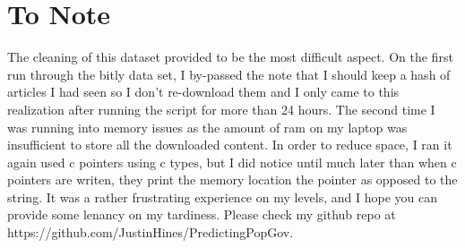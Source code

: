\documentclass[11pt]{article}
\begin{document}
\section{To Note}
The cleaning of this dataset provided to be the most difficult aspect.  On the first run through the bitly data set, I by-passed the note that I should keep a hash of articles I had seen so I don't re-download them and I only came to this realization after running the script for more than 24 hours. The second time I was running into memory issues as the amount of ram on my laptop was insufficient to store all the downloaded content.  In order to reduce space, I ran it again used c pointers using c types, but I did notice until much later than when c pointers are writen, they print the memory location the pointer as opposed to the string. It was a rather frustrating experience on my levels, and I hope you can provide some lenancy on my tardiness.  Please check my github repo at https://github.com/JustinHines/PredictingPopGov.
\end{document}
